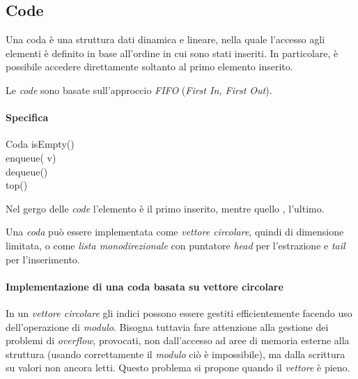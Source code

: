 \subsection{Code}
\begin{definition}[Coda]
    Una coda è una struttura dati dinamica e lineare, nella quale l'accesso agli
    elementi è definito in base all'ordine in cui sono stati inseriti. In
    particolare, è possibile accedere direttamente soltanto al primo elemento
    inserito.
\end{definition}
\begin{note}
    Le \emph{code} sono basate sull'approccio \emph{FIFO} (\emph{First In, First
    Out}).
\end{note}

\paragraph{Specifica}
\begin{code}{Coda}
     isEmpty()\\
    enqueue( v)\\
     dequeue()\\
     top()
\end{code}
\begin{note}
    Nel gergo delle \emph{code} l'elemento  è il primo inserito,
    mentre quello , l'ultimo.
\end{note}\noindent
Una \emph{coda} può essere implementata come \emph{vettore circolare}, quindi di
dimensione limitata, o come \emph{lista monodirezionale} con puntatore
\emph{head} per l'estrazione e \emph{tail} per l'inserimento.

\paragraph{Implementazione di una coda basata su vettore circolare}
In un \emph{vettore circolare} gli indici possono essere gestiti efficientemente
facendo uso dell'operazione di \emph{modulo}. Bisogna tuttavia fare attenzione
alla gestione dei problemi di \emph{overflow}, provocati, non dall'accesso ad
aree di memoria esterne alla struttura (usando correttamente il \emph{modulo} ciò
è impossibile), ma dalla scrittura su valori non ancora letti. Questo
problema si propone quando il \emph{vettore} è pieno.

